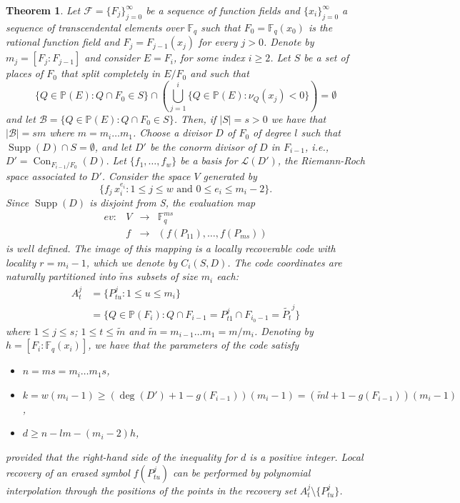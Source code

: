 \documentclass{amsart}
\newcommand{\m}{\mathcal}
\newcommand{\F}{\mathbb{F}}
\renewcommand{\P}{\mathbb{P}}
\newcommand{\con}{\operatorname{Con}}
\newcommand{\supp}{\operatorname{Supp}}
\newtheorem{thm}{Theorem}[section]
\theoremstyle{definition}
\begin{document}
\begin{thm} Let $\m{F}=\{F_j\}_{j=0}^{\infty}$ be a sequence of function fields and $\{x_i\}_{j=0}^{\infty}$ a sequence of transcendental elements over $\F_q$ such that $F_0=\F_q(x_0)$ is the rational function field and $F_j=F_{j-1}(x_j)$ for every $j>0$. Denote by $m_j=[F_j:F_{j-1}]$ and consider $E=F_{i}$, for some index $i\geq 2$.  
Let $S$ be a set of places of $F_0$ that split completely in $E/F_0$ and such that  
$$\{Q \in \P(E): Q\cap F_0 \in S\}\cap\left(
\bigcup_{j=1}^{i}\{Q\in \P(E): \nu_Q(x_j)<0\}\right)=\emptyset$$ and let $\m{B}=\{Q \in \P(E): Q\cap F_0 \in S\}$.  Then, if $|S|=s>0$ we have that $|\m{B}|= sm$
where $m=m_{i}\ldots m_1$.  Choose a divisor $D$ of $F_0$ of degree $l$ such that $\supp(D)\cap S=\emptyset$, and let $D'$ be the conorm divisor of $D$ in $F_{i-1}$, i.e., $D'=\con_{F_{i-1}/F_0}(D).$ Let $\{f_1, \ldots, f_w \}$ be a basis for $\m{L}(D')$, the Riemann-Roch space associated to $D'$. Consider the space $V$ generated by 
$$\{f_j\,x_{i}^{e_{i}}:1\leq j \leq w \text{ and }0 \leq  e_i\leq m_i-2\}.$$ Since $\supp(D)$ is disjoint from S, the evaluation map 
$$
\begin{array}{cccl}
 ev: & V  &  \longrightarrow& \F_q^{ms} \\
 & f& \rightarrow  &  (f(P_{11}), \ldots, f(P_{ms}) )
\end{array}
$$ is well defined. The image of this mapping is a locally recoverable code with locality $r=m_{i}-1$, which we denote by
$C_{i}(S,D)$. The code coordinates are naturally partitioned into $\widetilde{m}s$ subsets of size $m_{i}$ each: \begin{align*}
A_t^j &= \{P_{tu}^j:%
1 \leq u \leq m_{i}\}\\
& =\{Q\in \P(F_{i}): Q\cap F_{i-1}=P_{t1}^j\cap F_{i_0-1}=\widetilde{P_{t}}^j\}%
\end{align*} where $1\leq j \leq s$; $1\leq t \leq \widetilde{m}$ and $\widetilde{m}=m_{i-1}\ldots m_1=m/m_{i}$. Denoting by $h=[F_{i}:\F_q(x_i)]$, we have that the parameters of the code satisfy

\begin{itemize}
\item $n= ms=m_{i}\ldots m_1s$,
 \item $k= w(m_{i}-1)\geq (\deg(D')+1-g(F_{i-1}))(m_{i}-1)=(\widetilde{m}l+1-g(F_{i-1}))(m_i-1)$,
 \item $d\geq n-lm-(m_{i}-2)h$,
\end{itemize}
provided that the right-hand side of the inequality for $d$ is a positive integer. Local recovery of an erased symbol $f (P_{tu}^{j})$ can be performed by polynomial interpolation through the positions of the points in the recovery set $A_t^j\setminus\{P_{tu}^j\}$.
\end{thm}
\end{document}
